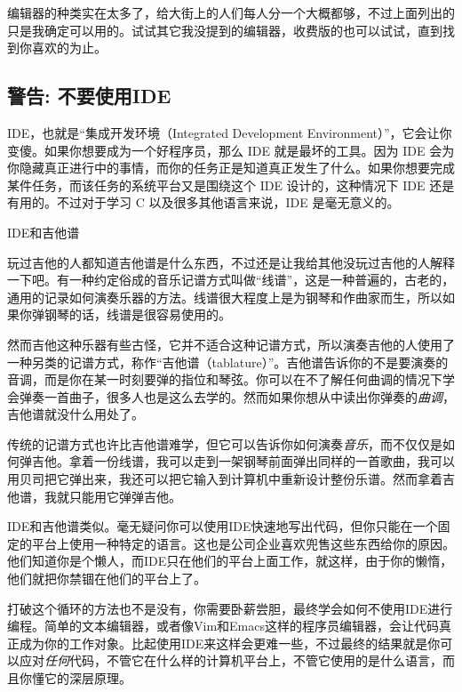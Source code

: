 编辑器的种类实在太多了，给大街上的人们每人分一个大概都够，不过上面列出的只是我确定可以用的。试试其它我没提到的编辑器，收费版的也可以试试，直到找到你喜欢的为止。

\subsection{警告: 不要使用IDE}

IDE，也就是“集成开发环境（Integrated Development Environment）”，它会让你变傻。如果你想要成为一个好程序员，那么 IDE 就是最坏的工具。因为 IDE 会为你隐藏真正进行中的事情，而你的任务正是知道真正发生了什么。如果你想要完成某件任务，而该任务的系统平台又是围绕这个 IDE 设计的，这种情况下 IDE 还是有用的。不过对于学习 C 以及很多其他语言来说，IDE 是毫无意义的。

\begin{aside}{IDE和吉他谱}

玩过吉他的人都知道吉他谱是什么东西，不过还是让我给其他没玩过吉他的人解释一下吧。有一种约定俗成的音乐记谱方式叫做“线谱”，这是一种普遍的，古老的，通用的记录如何演奏乐器的方法。线谱很大程度上是为钢琴和作曲家而生，所以如果你弹钢琴的话，线谱是很容易使用的。

然而吉他这种乐器有些古怪，它并不适合这种记谱方式，所以演奏吉他的人使用了一种另类的记谱方式，称作“吉他谱（tablature）”。吉他谱告诉你的不是要演奏的音调，而是你在某一时刻要弹的指位和琴弦。你可以在不了解任何曲调的情况下学会弹奏一首曲子，很多人也是这么去学的。然而如果你想从中读出你弹奏的\emph{曲调}，吉他谱就没什么用处了。

传统的记谱方式也许比吉他谱难学，但它可以告诉你如何演奏\emph{音乐}，而不仅仅是如何弹吉他。拿着一份线谱，我可以走到一架钢琴前面弹出同样的一首歌曲，我可以用贝司把它弹出来，我还可以把它输入到计算机中重新设计整份乐谱。然而拿着吉他谱，我就只能用它弹弹吉他。

IDE和吉他谱类似。毫无疑问你可以使用IDE快速地写出代码，但你只能在一个固定的平台上使用一种特定的语言。这也是公司企业喜欢兜售这些东西给你的原因。他们知道你是个懒人，而IDE只在他们的平台上面工作，就这样，由于你的懒惰，他们就把你禁锢在他们的平台上了。

打破这个循环的方法也不是没有，你需要卧薪尝胆，最终学会如何不使用IDE进行编程。简单的文本编辑器，或者像Vim和Emacs这样的程序员编辑器，会让代码真正成为你的工作对象。比起使用IDE来这样会更难一些，不过最终的结果就是你可以应对\emph{任何}代码，不管它在什么样的计算机平台上，不管它使用的是什么语言，而且你懂它的深层原理。

\end{aside}
